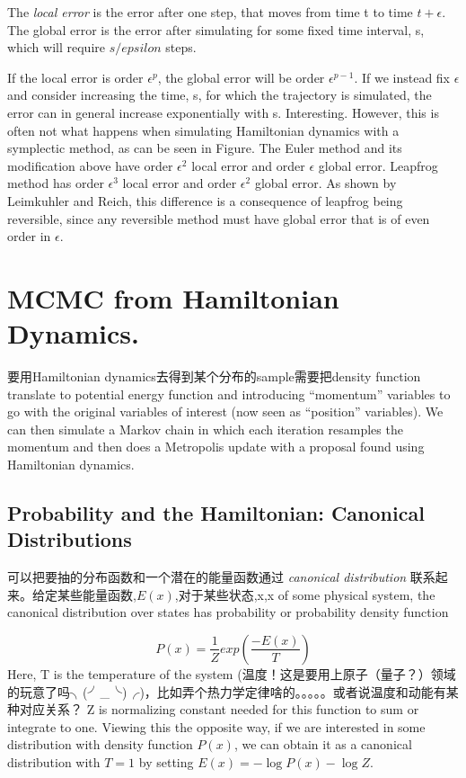 \documentclass[
]{book}
\theoremstyle{definition}
\theoremstyle{definition}
\theoremstyle{definition}
\theoremstyle{remark}
\begin{document}
The \emph{local error} is the error after one step, that moves from time t to time \(t+\epsilon\). The global error is the error after simulating for some fixed time interval, s, which will require \(s/epsilon\) steps.

If the local error is order \(\epsilon^p\), the global error will be order \(\epsilon^{p-1}\). If we instead fix \(\epsilon\) and consider increasing the time, s, for which the trajectory is simulated, the error can in general increase exponentially with s. Interesting. However, this is often not what happens when simulating Hamiltonian dynamics with a symplectic method, as can be seen in Figure. The Euler method and its modification above have order \(\epsilon^2\) local error and order \(\epsilon\) global error. Leapfrog method has order \(\epsilon^3\) local error and order \(\epsilon^2\) global error. As shown by Leimkuhler and Reich, this difference is a consequence of leapfrog being reversible, since any reversible method must have global error that is of even order in \(\epsilon.\)

\hypertarget{mcmc-from-hamiltonian-dynamics.}{%
\section{MCMC from Hamiltonian Dynamics.}\label{mcmc-from-hamiltonian-dynamics.}}

要用Hamiltonian dynamics去得到某个分布的sample需要把density function translate to potential energy function and introducing ``momentum'' variables to go with the original variables of interest (now seen as ``position'' variables). We can then simulate a Markov chain in which each iteration resamples the momentum and then does a Metropolis update with a proposal found using Hamiltonian dynamics.

\hypertarget{probability-and-the-hamiltonian-canonical-distributions}{%
\subsection{Probability and the Hamiltonian: Canonical Distributions}\label{probability-and-the-hamiltonian-canonical-distributions}}

可以把要抽的分布函数和一个潜在的能量函数通过 \emph{canonical distribution} 联系起来。给定某些能量函数,\(E(x)\),对于某些状态,x,x of some physical system, the canonical distribution over states has probability or probability density function

\[
P(x)=\frac{1}{Z}exp(\frac{-E(x)}{T})
\]
Here, T is the temperature of the system (温度！这是要用上原子（量子？）领域的玩意了吗╮(╯\_╰)╭)，比如弄个热力学定律啥的。。。。。或者说温度和动能有某种对应关系？
Z is normalizing constant needed for this function to sum or integrate to one. Viewing this the opposite way, if we are interested in some distribution with density function \(P(x)\), we can obtain it as a canonical distribution with \(T=1\) by setting \(E(x)=-\log P(x)-\log Z\).
\end{document}
